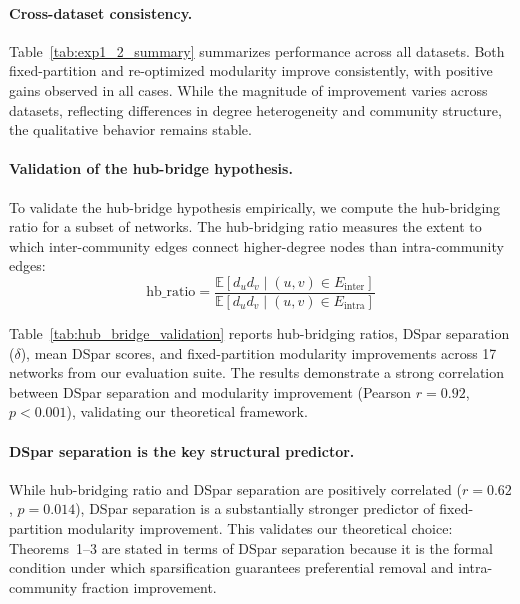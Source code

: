 \documentclass[10pt,journal,compsoc]{IEEEtran}
\begin{document}
\paragraph{Cross-dataset consistency.}
Table~\ref{tab:exp1_2_summary} summarizes performance across all datasets. Both fixed-partition and re-optimized modularity improve consistently, with positive gains observed in all cases. While the magnitude of improvement varies across datasets, reflecting differences in degree heterogeneity and community structure, the qualitative behavior remains stable.



\paragraph{Validation of the hub-bridge hypothesis.}
To validate the hub-bridge hypothesis empirically, we compute the hub-bridging ratio for a subset of networks. The hub-bridging ratio measures the extent to which inter-community edges connect higher-degree nodes than intra-community edges:
\begin{equation}
\text{hb\_ratio} = \frac{\mathbb{E}[d_u d_v \mid (u,v) \in E_{\text{inter}}]}
                       {\mathbb{E}[d_u d_v \mid (u,v) \in E_{\text{intra}}]}
\end{equation}

Table~\ref{tab:hub_bridge_validation} reports hub-bridging ratios, DSpar separation ($\delta$), mean DSpar scores, and fixed-partition modularity improvements across 17 networks from our evaluation suite. The results demonstrate a strong correlation between DSpar separation and modularity improvement (Pearson $r = 0.92$, $p < 0.001$), validating our theoretical framework.

\paragraph{DSpar separation is the key structural predictor.}
While hub-bridging ratio and DSpar separation are positively correlated ($r = 0.62$, $p = 0.014$), DSpar separation is a substantially stronger predictor of fixed-partition modularity improvement. This validates our theoretical choice: Theorems~1--3 are stated in terms of DSpar separation because it is the formal condition under which sparsification guarantees preferential removal and intra-community fraction improvement.
\end{document}
